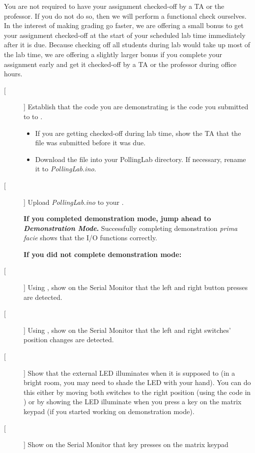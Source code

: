 You are not required to have your assignment checked-off by a TA or the
professor. If you do not do so, then we will perform a functional check
ourselves. In the interest of making grading go faster, we are offering a small
bonus to get your assignment checked-off at the start of your scheduled lab
time immediately after it is due. Because checking off all students during lab
would take up most of the lab time, we are offering a slightly larger bonus if
you complete your assignment early and get it checked-off by a TA or the
professor during office hours.

\begin{description}
\item [[ ]] Establish that the code you are demonstrating is the code you
    submitted to to \filesubmission.
    \begin{itemize}
    \item If you are getting checked-off during lab time, show the TA that the
        file was submitted before it was due.
    \item Download the file into your PollingLab directory. If necessary,
        rename it to \textit{PollingLab.ino}.
    \end{itemize}
\item [[ ]] Upload \textit{PollingLab.ino} to your \nano.
\item [] \textbf{If you completed demonstration mode, jump ahead to
    \textit{Demonstration Mode}.} Successfully completing demonstration
    \textit{prima facie} shows that the I/O functions correctly.
\item [] \textbf{If you did not complete demonstration mode:}
\item [[ ]] Using , show on the Serial Monitor that
    the left and right button presses are detected.
\item [[ ]] Using , show on the Serial Monitor that
    the left and right switches' position changes are detected.
\item [[ ]] Show that the external LED illuminates when it is supposed to (in a
    bright room, you may need to shade the LED with your hand). You can do this
    either by moving both switches to the right position (using the code in
    ) or by showing the LED illuminate when you
    press a key on the matrix keypad (if you started working on demonstration
    mode).
\item [[ ]] Show on the Serial Monitor that key presses on the matrix keypad

\end{description}
